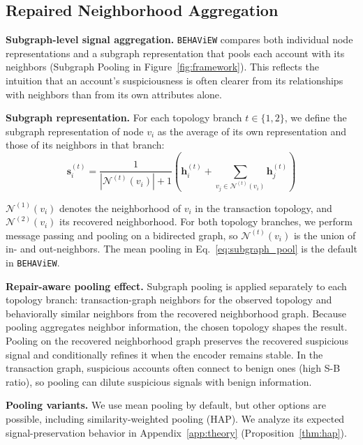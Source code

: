 \documentclass[sigconf,natbib=true,anonymous=true]{acmart}
\theoremstyle{definition}
\newcommand{\method}{\texttt{BEHAViEW}\xspace}
\begin{document}
\subsection{Repaired Neighborhood Aggregation}
\label{subsec:subgraph_pool}
\textbf{Subgraph-level signal aggregation.} \method compares both individual node representations and a subgraph representation that pools each account with its neighbors (Subgraph Pooling in Figure~\ref{fig:framework}). This reflects the intuition that an account’s suspiciousness is often clearer from its relationships with neighbors than from its own attributes alone.

\textbf{Subgraph representation.} For each topology branch $t \in \{1,2\}$, we define the subgraph representation of node $v_i$ as the average of its own representation and those of its neighbors in that branch:
\begin{equation}\label{eq:subgraph_pool}
    \mathbf{s}_i^{(t)} = \frac{1}{|\mathcal{N}^{(t)}(v_i)| + 1}
    \left(\mathbf{h}_i^{(t)} + \sum_{v_j \in \mathcal{N}^{(t)}(v_i)} \mathbf{h}_j^{(t)}\right)
\end{equation}

$\mathcal{N}^{(1)}(v_i)$ denotes the neighborhood of $v_i$ in the transaction topology, and $\mathcal{N}^{(2)}(v_i)$ its recovered neighborhood. For both topology branches, we perform message passing and pooling on a bidirected graph, so $\mathcal{N}^{(t)}(v_i)$ is the union of in- and out-neighbors. The mean pooling in Eq.~\eqref{eq:subgraph_pool} is the default in \method.

\textbf{Repair-aware pooling effect.} Subgraph pooling is applied separately to each topology branch: transaction-graph neighbors for the observed topology and behaviorally similar neighbors from the recovered neighborhood graph. Because pooling aggregates neighbor information, the chosen topology shapes the result. Pooling on the recovered neighborhood graph preserves the recovered suspicious signal and conditionally refines it when the encoder remains stable. In the transaction graph, suspicious accounts often connect to benign ones (high S-B ratio), so pooling can dilute suspicious signals with benign information.

\textbf{Pooling variants.} We use mean pooling by default, but other options are possible, including similarity-weighted pooling (HAP). We analyze its expected signal-preservation behavior in Appendix~\ref{app:theory} (Proposition~\ref{thm:hap}).
\end{document}
